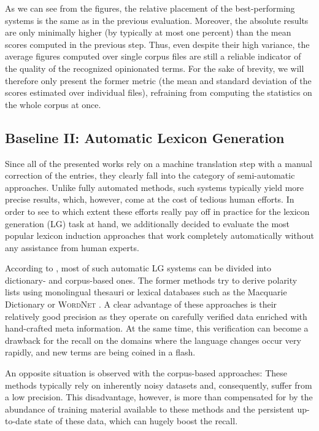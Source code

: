 As we can see from the figures, the relative placement of the
best-performing systems is the same as in the previous evaluation.
Moreover, the absolute results are only minimally higher (by typically
at most one percent) than the mean scores computed in the previous
step.  Thus, even despite their high variance, the average figures
computed over single corpus files are still a reliable indicator of
the quality of the recognized opinionated terms.  For the sake of
brevity, we will therefore only present the former metric (the mean
and standard deviation of the scores estimated over individual files),
refraining from computing the statistics on the whole corpus at once.

\subsection{Baseline II: Automatic Lexicon Generation}

Since all of the presented works rely on a machine translation step
with a manual correction of the entries, they clearly fall into the
category of semi-automatic approaches.  Unlike fully automated
methods, such systems typically yield more precise results, which,
however, come at the cost of tedious human efforts.  In order to see
to which extent these efforts really pay off in practice for the
lexicon generation (LG) task at hand, we additionally decided to
evaluate the most popular lexicon induction approaches that work
completely automatically without any assistance from human experts.

According to \citet[p. 79]{Liu:12}, most of such automatic LG systems
can be divided into dictionary- and corpus-based ones.  The former
methods try to derive polarity lists using monolingual thesauri or
lexical databases such as the Macquarie Dictionary \cite{Bernard:86}
or \textsc{WordNet} \cite{Miller:95}.  A clear advantage of these
approaches is their relatively good precision as they operate on
carefully verified data enriched with hand-crafted meta information.
At the same time, this verification can become a drawback for the
recall on the domains where the language changes occur very rapidly,
and new terms are being coined in a flash.

An opposite situation is observed with the corpus-based approaches:
These methods typically rely on inherently noisy datasets and,
consequently, suffer from a low precision.  This disadvantage,
however, is more than compensated for by the abundance of training
material available to these methods and the persistent up-to-date
state of these data, which can hugely boost the recall.

